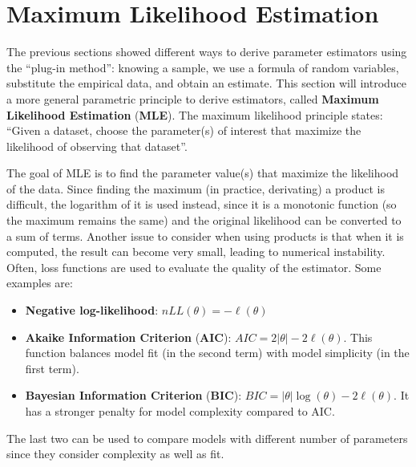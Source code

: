 \section{Maximum Likelihood Estimation}

The previous sections showed different ways to derive parameter estimators using the ``plug-in method'': knowing a sample, we use a formula of random variables, substitute the empirical data, and obtain an estimate. This section will introduce a more general parametric principle to derive estimators, called \textbf{Maximum Likelihood Estimation} (\textbf{MLE}). The maximum likelihood principle states: ``Given a dataset, choose the parameter(s) of interest that maximize the likelihood of observing that dataset''. 

The goal of MLE is to find the parameter value(s) that maximize the likelihood of the data. Since finding the maximum (in practice, derivating) a product is difficult, the logarithm of it is used instead, since it is a monotonic function (so the maximum remains the same) and the original likelihood can be converted to a sum of terms. Another issue to consider when using products is that when it is computed, the result can become very small, leading to numerical instability.
Often, loss functions are used to evaluate the quality of the estimator. Some examples are:
\begin{itemize}
    \item \textbf{Negative log-likelihood}: $nLL(\theta) = -\ell(\theta)$
    \item \textbf{Akaike Information Criterion} (\textbf{AIC}): $AIC = 2 |\theta| - 2 \ell(\theta)$. This function balances model fit (in the second term) with model simplicity (in the first term).
    \item \textbf{Bayesian Information Criterion} (\textbf{BIC}): $BIC = |\theta| \log(\theta) - 2 \ell(\theta)$. It has a stronger penalty for model complexity compared to AIC.
\end{itemize}
The last two can be used to compare models with different number of parameters since they consider complexity as well as fit.

